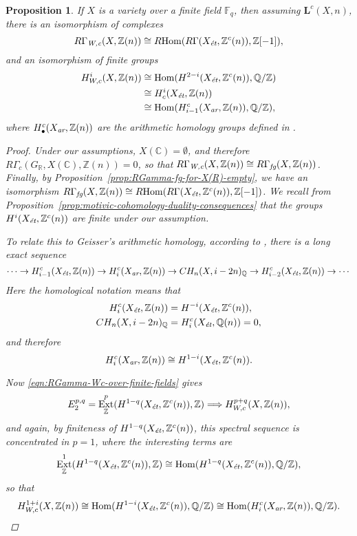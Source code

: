 \documentclass[leqno,12pt]{article}
\theoremstyle{plain}
\newtheorem{proposition}[theorem]{\indent\sc Proposition}
\theoremstyle{definition}
\DeclareMathOperator{\Hom}{Hom}
\DeclareMathOperator{\Ext}{Ext}
\newcommand{\CC}{\mathbb{C}}
\newcommand{\FF}{\mathbb{F}}
\newcommand{\QQ}{\mathbb{Q}}
\newcommand{\RR}{\mathbb{R}}
\newcommand{\ZZ}{\mathbb{Z}}
\newcommand{\Wc}{\text{\it W,c}}
\newcommand{\ar}{\text{\it ar}}
\newcommand{\et}{\text{\it \'{e}t}}
\newcommand{\fg}{\text{\it fg}}
\newcommand{\RHom}{R\!\Hom}
\begin{document}
\begin{proposition}
  If $X$ is a variety over a finite field $\FF_q$, then assuming
  $\mathbf{L}^c (X,n)$, there is an isomorphism of complexes
  \begin{equation}
    \label{eqn:RGamma-Wc-over-finite-fields}
    R\Gamma_\Wc (X,\ZZ(n)) \cong \RHom (R\Gamma (X_\et, \ZZ^c (n)), \ZZ [-1]),
  \end{equation}
  and an isomorphism of finite groups
  \begin{align*}
    H^i_{W,c} (X, \ZZ (n)) & \cong
                             \Hom (H^{2-i} (X_\et, \ZZ^c (n)), \QQ/\ZZ)\\
                           & \cong
                             H^i_c (X_\et, \ZZ(n)) \\
                           & \cong
                             \Hom (H_{i-1}^c (X_\ar, \ZZ (n)), \QQ/\ZZ),
  \end{align*}
  where $H_\bullet^c (X_\ar, \ZZ (n))$ are the arithmetic homology groups
  defined in {\rm \cite[\S 3]{Geisser-2010-arithmetic-homology}}.

  \begin{proof}
    Under our assumptions, $X (\CC) = \emptyset$, and therefore
    $R\Gamma_c (G_\RR, X (\CC), \ZZ (n)) = 0$, so that
    $R\Gamma_\Wc (X,\ZZ(n)) \cong R\Gamma_\fg (X, \ZZ (n))$. Finally, by
    Proposition~\ref{prop:RGamma-fg-for-X(R)-empty}, we have an isomorphism
    $R\Gamma_\fg (X, \ZZ (n)) \cong \RHom (R\Gamma (X_\et, \ZZ^c (n)), \ZZ
    [-1])$.  We recall from
    Proposition~\ref{prop:motivic-cohomology-duality-consequences} that the
    groups $H^i (X_\et, \ZZ^c(n))$ are finite under our assumption.

    To relate this to Geisser's arithmetic homology, according to
    \cite[Theorem~3.1]{Geisser-2010-arithmetic-homology}, there is a long exact
    sequence
    \[ \cdots \to H_{i-1}^c (X_\et, \ZZ (n)) \to
      H_i^c (X_\ar, \ZZ (n)) \to CH_n (X, i-2n)_\QQ \to
      H_{i-2}^c (X_\et, \ZZ (n)) \to \cdots \]
    Here the homological notation means that
    \begin{align*}
      H_i^c (X_\et, \ZZ (n)) & = H^{-i} (X_\et, \ZZ^c (n)), \\
      CH_n (X, i-2n)_\QQ & = H_i^c (X_\et, \QQ (n)) = 0,
    \end{align*}
    and therefore
    $$H_i^c (X_\ar, \ZZ (n)) \cong H^{1-i} (X_\et, \ZZ^c (n)).$$

    Now \eqref{eqn:RGamma-Wc-over-finite-fields} gives
    \[
      E_2^{p,q} = \Ext_\ZZ^p (H^{1-q} (X_\et, \ZZ^c (n)), \ZZ)
      \Longrightarrow H^{p+q}_{W,c} (X, \ZZ (n)),
    \]
    and again, by finiteness of $H^{1-q} (X_\et, \ZZ^c (n))$, this spectral
    sequence is concentrated in $p = 1$, where the interesting terms are
    \[ \Ext_\ZZ^1 (H^{1-q} (X_\et, \ZZ^c (n)), \ZZ) \cong
      \Hom (H^{1-q} (X_\et, \ZZ^c (n)), \QQ/\ZZ), \]
    so that
    \[ H^{1+i}_{W,c} (X, \ZZ (n)) \cong
      \Hom (H^{1-i} (X_\et, \ZZ^c (n)), \QQ/\ZZ) \cong
      \Hom (H_i^c (X_\ar, \ZZ (n)), \QQ/\ZZ). \qedhere \]
  \end{proof}
\end{proposition}
\end{document}
